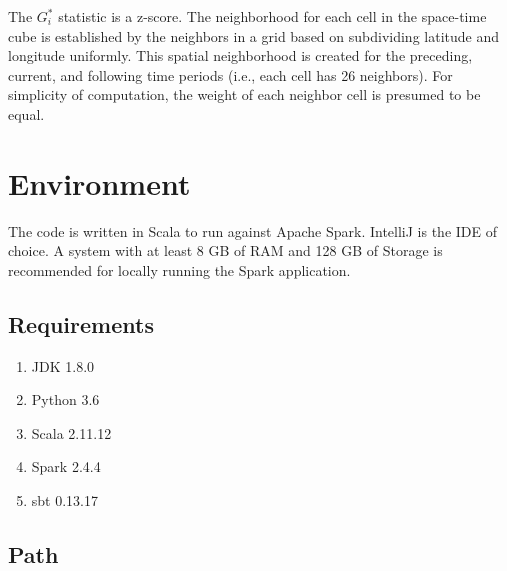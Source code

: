     The $G_i^*$ statistic is a z-score. The neighborhood for each cell in the space-time cube is established by the neighbors in a grid based on subdividing latitude and longitude uniformly. This spatial neighborhood is created for the preceding, current, and following time periods (i.e., each cell has 26 neighbors). For simplicity of computation, the weight of each neighbor cell is presumed to be equal.

\newpage

\section{Environment} \label{Environment}
The code is written in Scala to run against Apache Spark. IntelliJ is the IDE of choice. A system with at least 8 GB of RAM and 128 GB of Storage is recommended for locally running the Spark application.

\subsection{Requirements}
\begin{enumerate}
    \item JDK 1.8.0
    \item Python 3.6
    \item Scala 2.11.12
    \item Spark 2.4.4
    \item sbt 0.13.17
\end{enumerate}

\subsection{Path}

